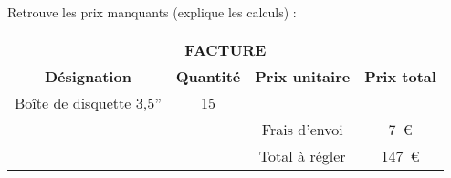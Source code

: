 \par Retrouve les prix manquants (explique les calculs) :
\begin{center}
  \begin{tabular}{|c|c|c|c|}
\hline
\multicolumn{4}{|c|}{\bf FACTURE}\\
{\bf Désignation}&{\bf Quantité}&{\bf Prix unitaire}&{\bf Prix total}\\
\hline
Boîte de disquette 3,5''&15&&\\
\hline
\multicolumn{2}{|c}{}&\multicolumn{1}{c}{Frais d'envoi}&7~\textgreek{\euro}\\
\hline
\multicolumn{2}{|c}{}&\multicolumn{1}{c}{Total à régler}&147~\textgreek{\euro}\\
\hline
  \end{tabular}
\end{center}